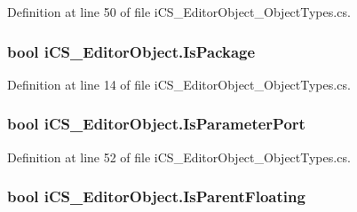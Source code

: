 Definition at line 50 of file i\+C\+S\+\_\+\+Editor\+Object\+\_\+\+Object\+Types.\+cs.

\hypertarget{classi_c_s___editor_object_aae51894be3c653a2c69df2fe4e1b5161}{
\subsubsection[{Is\+Package}]{\setlength{\rightskip}{0pt plus 5cm}bool i\+C\+S\+\_\+\+Editor\+Object.\+Is\+Package\hspace{0.3cm}{\ttfamily [get]}}}\label{classi_c_s___editor_object_aae51894be3c653a2c69df2fe4e1b5161}


Definition at line 14 of file i\+C\+S\+\_\+\+Editor\+Object\+\_\+\+Object\+Types.\+cs.

\hypertarget{classi_c_s___editor_object_ad912c6d5c3b0186d997d83e2b1a1c014}{
\subsubsection[{Is\+Parameter\+Port}]{\setlength{\rightskip}{0pt plus 5cm}bool i\+C\+S\+\_\+\+Editor\+Object.\+Is\+Parameter\+Port\hspace{0.3cm}{\ttfamily [get]}}}\label{classi_c_s___editor_object_ad912c6d5c3b0186d997d83e2b1a1c014}


Definition at line 52 of file i\+C\+S\+\_\+\+Editor\+Object\+\_\+\+Object\+Types.\+cs.

\hypertarget{classi_c_s___editor_object_aff19b2e9012cd0fdec323fc061a82ec5}{
\subsubsection[{Is\+Parent\+Floating}]{\setlength{\rightskip}{0pt plus 5cm}bool i\+C\+S\+\_\+\+Editor\+Object.\+Is\+Parent\+Floating\hspace{0.3cm}{\ttfamily [get]}}}\label{classi_c_s___editor_object_aff19b2e9012cd0fdec323fc061a82ec5}



